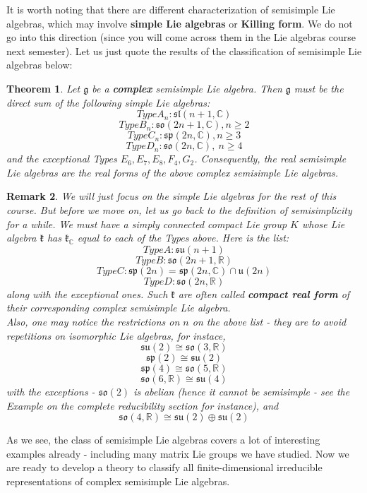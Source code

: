 \documentclass[11pt]{article}
\newtheorem{theorem}{Theorem}[section]
\newtheorem{remark}[theorem]{Remark}
\newcommand{\bb}[1]{\mathbb{#1}}
\newcommand{\mf}[1]{\mathfrak{#1}}
\begin{document}
It is worth noting that there are different characterization of semisimple Lie algebras, which may involve \textbf{simple Lie algebras} or \textbf{Killing form}. We do not go into this direction (since you will come across them in the Lie algebras course next semester). Let us just quote the results of the classification of semisimple Lie algebras below:
\begin{theorem}
Let $\mf{g}$ be a \textbf{complex} semisimple Lie algebra. Then $\mf{g}$ must be the direct sum of the following simple Lie algebras:
$$Type A_n: \mf{sl}(n+1,\bb{C})$$
$$Type B_n: \mf{so}(2n+1,\bb{C}), n \geq 2$$
$$Type C_n: \mf{sp}(2n,\bb{C}), n \geq 3$$
$$Type D_n: \mf{so}(2n,\bb{C}),\ n \geq 4$$
and the exceptional Types $E_6, E_7, E_8, F_4, G_2$.
Consequently, the real semisimple Lie algebras are the real forms of the above complex semisimple Lie algebras.
\end{theorem}
\begin{remark}
We will just focus on the simple Lie algebras for the rest of this course. But before we move on, let us go back to the definition of semisimplicity for a while. We must have a simply connected compact Lie group $K$ whose Lie algebra $\mf{k}$ has $\mf{k}_{\bb{C}}$ equal to each of the Types above. Here is the list:
$$Type A: \mf{su}(n+1)$$
$$Type B: \mf{so}(2n+1,\bb{R})$$
$$Type C: \mf{sp}(2n) = \mf{sp}(2n,\bb{C}) \cap \mf{u}(2n)$$
$$Type D: \mf{so}(2n,\bb{R})$$
along with the exceptional ones. Such $\mf{k}$ are often called \textbf{compact real form} of their corresponding complex semisimple Lie algebra.\\
Also, one may notice the restrictions on $n$ on the above list - they are to avoid repetitions on isomorphic Lie algebras, for instace,
$$\mf{su}(2) \cong \mf{so}(3,\bb{R})$$
$$\mf{sp}(2) \cong \mf{su}(2)$$
$$\mf{sp}(4) \cong \mf{so}(5,\bb{R})$$
$$\mf{so}(6,\bb{R}) \cong \mf{su}(4)$$
with the exceptions - $\mf{so}(2)$ is abelian (hence it cannot be semisimple - see the Example on the complete reducibility section for instance), and
$$\mf{so}(4,\bb{R}) \cong \mf{su}(2) \oplus \mf{su}(2)$$
\end{remark}
As we see, the class of semisimple Lie algebras covers a lot of interesting examples already - including many matrix Lie groups we have studied. Now we are ready to develop a theory to classify all finite-dimensional irreducible representations of complex semisimple Lie algebras.
\end{document}

